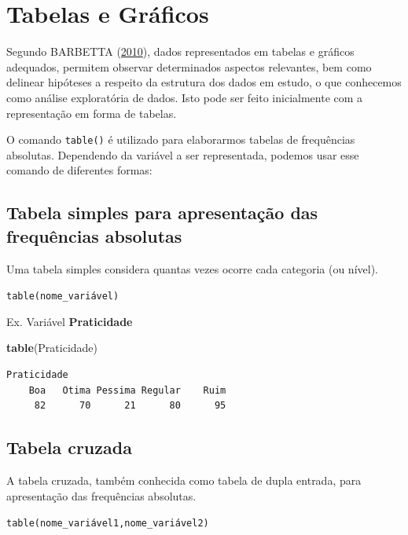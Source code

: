 \documentclass[12pt,brazil,oneside]{book}
\newenvironment{Shaded}{\begin{snugshade}}{\end{snugshade}}
\newcommand{\KeywordTok}[1]{\textcolor[rgb]{0.13,0.29,0.53}{\textbf{#1}}}
\newcommand{\NormalTok}[1]{#1}
\begin{document}
\hypertarget{tabelas-e-graficos}{%
\section{Tabelas e Gráficos}\label{tabelas-e-graficos}}

Segundo BARBETTA (\protect\hyperlink{ref-barbetta1988}{2010}), dados
representados em tabelas e gráficos adequados, permitem observar
determinados aspectos relevantes, bem como delinear hipóteses a respeito
da estrutura dos dados em estudo, o que conhecemos como análise
exploratória de dados. Isto pode ser feito inicialmente com a
representação em forma de tabelas.

O comando \texttt{table()} é utilizado para elaborarmos tabelas de
frequências absolutas. Dependendo da variável a ser representada,
podemos usar esse comando de diferentes formas:

\hypertarget{tabela-simples-para-apresentacao-das-frequencias-absolutas}{%
\subsection{Tabela simples para apresentação das frequências
absolutas}\label{tabela-simples-para-apresentacao-das-frequencias-absolutas}}

Uma tabela simples considera quantas vezes ocorre cada categoria (ou
nível).

\texttt{table(nome\_variável)}

Ex. Variável \textbf{Praticidade}

\begin{Shaded}
\begin{Highlighting}[]
\KeywordTok{table}\NormalTok{(Praticidade)}
\end{Highlighting}
\end{Shaded}

\begin{verbatim}
Praticidade
    Boa   Otima Pessima Regular    Ruim 
     82      70      21      80      95 
\end{verbatim}

\hypertarget{tabela-cruzada}{%
\subsection{Tabela cruzada}\label{tabela-cruzada}}

A tabela cruzada, também conhecida como tabela de dupla entrada, para
apresentação das frequências absolutas.

\texttt{table(nome\_variável1,nome\_variável2)}
\end{document}
